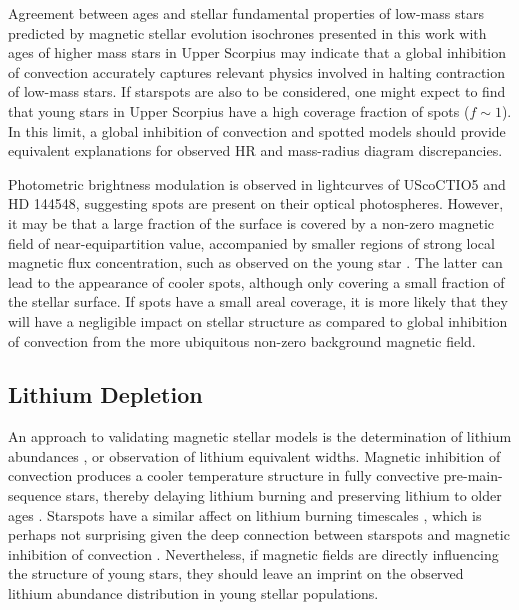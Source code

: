 \documentclass{aa}
\begin{document}
Agreement between ages and stellar fundamental properties of low-mass stars predicted by magnetic stellar evolution isochrones presented in this work with ages of higher mass stars in Upper Scorpius may indicate that a global inhibition of convection accurately captures relevant physics involved in halting contraction of low-mass stars. If starspots are also to be considered, one might expect to find that young stars in Upper Scorpius have a high coverage fraction of spots ($f \sim 1$). In this limit, a global inhibition of convection and spotted models \citep[e.g.,][]{Somers2015b} should provide equivalent explanations for observed HR and mass-radius diagram discrepancies.

Photometric brightness modulation is observed in lightcurves of UScoCTIO5 and HD 144548, suggesting spots are present on their optical photospheres. However, it may be that a large fraction of the surface is covered by a non-zero magnetic field of near-equipartition value, accompanied by smaller regions of strong local magnetic flux concentration, such as observed on the young star  \citep{Shulyak2014}. The latter can lead to the appearance of cooler spots, although only covering a small fraction of the stellar surface. If spots have a small areal coverage, it is more likely that they will have a negligible impact on stellar structure as compared to global inhibition of convection from the more ubiquitous non-zero background magnetic field.

\subsection{Lithium Depletion}
An approach to validating magnetic stellar models is the determination of lithium abundances \citep{MacDonald2015}, or observation of lithium equivalent widths. Magnetic inhibition of convection produces a cooler temperature structure in fully convective pre-main-sequence stars, thereby delaying lithium burning and preserving lithium to older ages \citep{Ventura1998, DAntona2000, MM10, FC13, Malo2014, MacDonald2015}. Starspots have a similar affect on lithium burning timescales \citep{Jackson2014b, Somers2015b}, which is perhaps not surprising given the deep connection between starspots and magnetic inhibition of convection \citep{Biermann1941, Deinzer1965}. Nevertheless, if magnetic fields are directly influencing the structure of young stars, they should leave an imprint on the observed lithium abundance distribution in young stellar populations.
 
\end{document}
